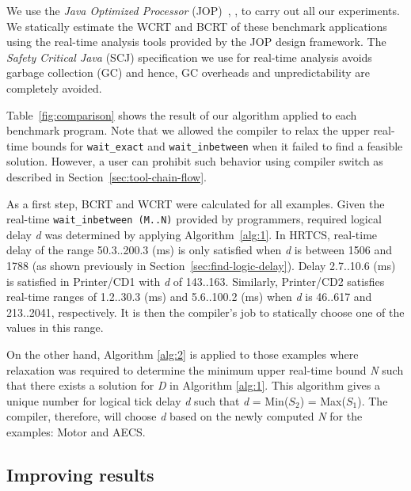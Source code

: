 We use the \textit{Java Optimized Processor}
(JOP)~\cite{jop:jnl:jsa2007}, , to carry out all our experiments. We statically estimate the
WCRT and BCRT of these benchmark applications using the real-time
analysis tools provided by the JOP design framework. The \textit{Safety
Critical Java} (SCJ) specification we use for real-time analysis avoids
garbage collection (GC) and hence, GC overheads and unpredictability are
completely avoided.


Table~\ref{fig:comparison} shows the result of our algorithm applied to
each benchmark program. Note that we allowed the compiler to relax the
upper real-time bounds for \texttt{wait\_exact} and
\texttt{wait\_inbetween} when it failed to find a feasible solution.
However, a user can prohibit such behavior using compiler switch as
described in Section~\ref{sec:tool-chain-flow}.

As a first step, BCRT and WCRT were calculated for all examples. Given
the real-time \mbox{\texttt{wait\_inbetween (M..N)}} provided by
programmers, required logical delay \textit{d} was determined by
applying Algorithm~\ref{alg:1}. In HRTCS, real-time delay of the range
50.3..200.3 (ms) is only satisfied when \emph{d} is between 1506 and
1788 (as shown previously in Section~\ref{sec:find-logic-delay}). Delay
2.7..10.6 (ms) is satisfied in Printer/CD1 with \emph{d} of 143..163.
Similarly, Printer/CD2 satisfies real-time ranges of 1.2..30.3 (ms) and
5.6..100.2 (ms) when \emph{d} is 46..617 and 213..2041, respectively. It
is then the compiler's job to statically choose one of the values in
this range.

On the other hand, Algorithm \ref{alg:2} is applied to those examples
where relaxation was required to determine the minimum upper real-time
bound \emph{N} such that there exists a solution for \emph{D} in
Algorithm \ref{alg:1}. This algorithm gives a unique number for logical
tick delay \emph{d} such that \emph{d} = Min(\emph{$S_2$}) =
Max(\emph{$S_1$}). The compiler, therefore, will choose \emph{d} based
on the newly computed \emph{N} for the examples: Motor and AECS.

\subsection{Improving results}

